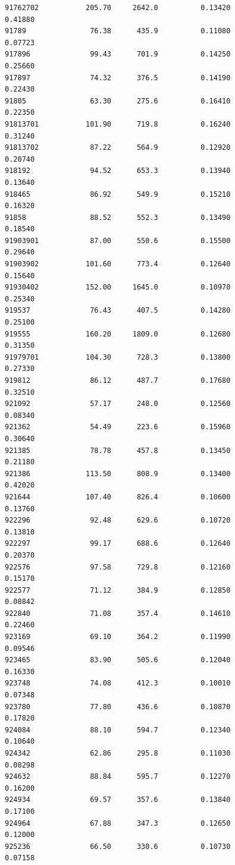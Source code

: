\documentclass[
  letterpaper,
  DIV=11,
  numbers=noendperiod]{scrartcl}
\begin{document}
\begin{verbatim}
91762702           205.70     2642.0          0.13420           0.41880
91789               76.38      435.9          0.11080           0.07723
917896              99.43      701.9          0.14250           0.25660
917897              74.32      376.5          0.14190           0.22430
91805               63.30      275.6          0.16410           0.22350
91813701           101.90      719.8          0.16240           0.31240
91813702            87.22      564.9          0.12920           0.20740
918192              94.52      653.3          0.13940           0.13640
918465              86.92      549.9          0.15210           0.16320
91858               88.52      552.3          0.13490           0.18540
91903901            87.00      550.6          0.15500           0.29640
91903902           101.60      773.4          0.12640           0.15640
91930402           152.00     1645.0          0.10970           0.25340
919537              76.43      407.5          0.14280           0.25100
919555             160.20     1809.0          0.12680           0.31350
91979701           104.30      728.3          0.13800           0.27330
919812              86.12      487.7          0.17680           0.32510
921092              57.17      248.0          0.12560           0.08340
921362              54.49      223.6          0.15960           0.30640
921385              78.78      457.8          0.13450           0.21180
921386             113.50      808.9          0.13400           0.42020
921644             107.40      826.4          0.10600           0.13760
922296              92.48      629.6          0.10720           0.13810
922297              99.17      688.6          0.12640           0.20370
922576              97.58      729.8          0.12160           0.15170
922577              71.12      384.9          0.12850           0.08842
922840              71.08      357.4          0.14610           0.22460
923169              69.10      364.2          0.11990           0.09546
923465              83.90      505.6          0.12040           0.16330
923748              74.08      412.3          0.10010           0.07348
923780              77.80      436.6          0.10870           0.17820
924084              88.10      594.7          0.12340           0.10640
924342              62.86      295.8          0.11030           0.08298
924632              88.84      595.7          0.12270           0.16200
924934              69.57      357.6          0.13840           0.17100
924964              67.88      347.3          0.12650           0.12000
925236              66.50      330.6          0.10730           0.07158

\end{verbatim}
\end{document}
